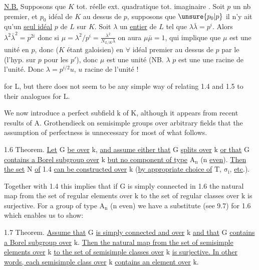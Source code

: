\uline{N.B.} Supposons que $K$  tot. réelle 
  ext. quadratique
 tot. imaginaire 
. Soit $p$ un nb premier, et
$p_0$ idéal de $K$ au dessus de $p$, supposons que $\unsure{p_0|p}$ il n'y ait
qu'un \uline{seul idéal}  $p$  de $L$ sur $K$. Soit $\lambda$ un
\uline{entier} de $L$ tel que $\lambda\bar\lambda=p^i$. Alors $\lambda^2\bar\lambda^2=p^{2i}$ donc
si $\mu=\lambda^2/p^i=\frac{\lambda^2}{N_{L/K}\lambda}$ on aura $\mu\bar\mu=1$, 
qui implique que $\mu$ est une unité en $p$, donc ($K$ étant galoisien)
en $\forall$ idéal premier au dessus de $p$ par le  (l'hyp. sur
$p$     pour les $p'$), donc $\mu$ est une unité (NB. $\lambda$  $p$ est une
une racine de l'unité. Donc $\lambda=p^{i/2}u$, $u$ racine
de l'unité !

for $\mathrm{L}$, but there does not seem to be any simple way of relating 1.4 and
1.5 to their analogues for $\mathrm{L}$.

We now introduce a perfect subfield $\mathrm{k}$ of $\mathrm{K}$, although it appears
from recent results of A. Grothendieck on semisimple groups over arbitrary
fields that the assumption of perfectness is unnecessary for most of what
follows.

1.6 Theorem. \uline{Let} $\mathrm{G}$ \uline{be over} $\mathrm{k}$, \uline{and assume either that} $\mathrm{G}$ \uline{splits
over} $\mathrm{k}$ \uline{or that} $\mathrm{G}$ \uline{contains a Borel subgroup over} $\mathrm{k}$ \uline{but no component of
type} $\mathrm{A_n}$ ($\mathrm{n}$ \uline{even}). \uline{Then the set} $\mathrm{N}$ \uline{of} 1.4 \uline{can be constructed over} $\mathrm{k}$
(\uline{by appropriate choice of} $\mathrm{T}$, $\mathrm{\sigma_i}$, \uline{etc}.).

Together with 1.4 this implies that if $\mathrm{G}$ is simply connected in 1.6
the natural map from the set of regular elements over $\mathrm{k}$ to the set of
regular classes over $\mathrm{k}$ is surjective. For a group of type $\mathrm{A_n}$ ($\mathrm{n}$ even)
we have a substitute (see 9.7) for 1.6 which enables us to show:

1.7 Theorem. \uline{Assume that} $\mathrm{G}$ \uline{is simply connected and over} $\mathrm{k}$ \uline{and
that} $\mathrm{G}$ \uline{contains a Borel subgroup over}  $\mathrm{k}$. \uline{Then the natural map from the
set of semisimple elements over} $\mathrm{k}$ \uline{to the set of semisimple classes over} $\mathrm{k}$
\uline{is surjective. In other words, each semisimple class over} $\mathrm{k}$ \uline{contains an
element over} $\mathrm{k}$.

